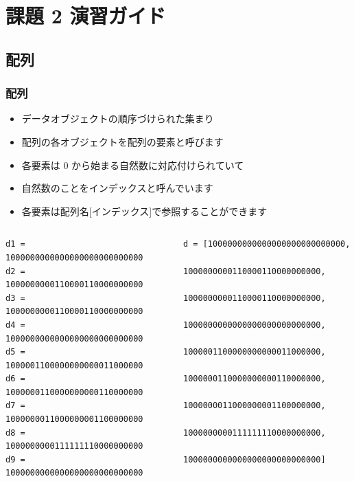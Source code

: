\section{課題 2 演習ガイド}
%
%
\subsection{配列}
\begin{frame}[containsverbatim]
\frametitle{配列}
  \begin{itemize}
\item データオブジェクトの順序づけられた集まり
\item 配列の各オブジェクトを配列の要素と呼びます
\item 各要素は 0 から始まる自然数に対応付けられていて
\item 自然数のことをインデックスと呼んでいます
\item 各要素は配列名[インデックス]で参照することができます
  \end{itemize}
\tiny
  \begin{columns}
    \begin{column}{0.45\textwidth}
      \begin{lstlisting}[caption={単純な変数},label=naive]
d1 =  1000000000000000000000000000
d2 =  1000000000110000110000000000
d3 =  1000000000110000110000000000
d4 =  1000000000000000000000000000
d5 =  1000001100000000000011000000
d6 =  1000000110000000000110000000
d7 =  1000000011000000001100000000
d8 =  1000000000111111110000000000
d9 =  1000000000000000000000000000
      \end{lstlisting}
    \end{column}
    \begin{column}{0.45\textwidth}
      \begin{lstlisting}[caption={配列},label=array]
 d = [1000000000000000000000000000,
      1000000000110000110000000000,
      1000000000110000110000000000,
      1000000000000000000000000000,
      1000001100000000000011000000,
      1000000110000000000110000000,
      1000000011000000001100000000,
      1000000000111111110000000000,
      1000000000000000000000000000]
      \end{lstlisting}
    \end{column}
  \end{columns}
\end{frame}
